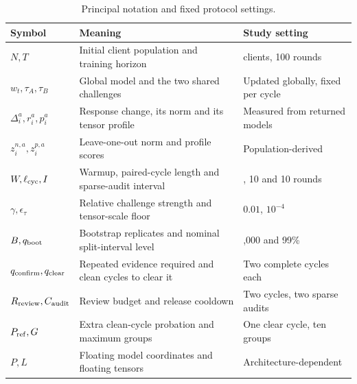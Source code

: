 \begin{table}[t]\centering\footnotesize
\renewcommand{\arraystretch}{1.12}
\caption{Principal notation and fixed protocol settings.}\label{tab:notation-settings}
\begin{tabular}{>{\raggedright\arraybackslash}p{3.1cm}>{\raggedright\arraybackslash}p{8.0cm}>{\raggedright\arraybackslash}p{4.8cm}}\toprule
Symbol & Meaning & Study setting \\ \midrule
$N,T$ & Initial client population and training horizon & 100 clients, 100 rounds \\
$w_t,\tau_A,\tau_B$ & Global model and the two shared challenges & Updated globally, fixed per cycle \\
$\Delta_i^a,r_i^a,p_i^a$ & Response change, its norm and its tensor profile & Measured from returned models \\
$z_i^{n,a},z_i^{p,a}$ & Leave-one-out norm and profile scores & Population-derived \\
$W,\ell_{\rm cyc},I$ & Warmup, paired-cycle length and sparse-audit interval & 10, 10 and 10 rounds \\
$\gamma,\epsilon_\tau$ & Relative challenge strength and tensor-scale floor & $0.01$, $10^{-4}$ \\
$B,q_{\rm boot}$ & Bootstrap replicates and nominal split-interval level & 1,000 and 99\% \\
$q_{\rm confirm},q_{\rm clear}$ & Repeated evidence required and clean cycles to clear it & Two complete cycles each \\
$R_{\rm review},C_{\rm audit}$ & Review budget and release cooldown & Two cycles, two sparse audits \\
$P_{\rm ref},G$ & Extra clean-cycle probation and maximum groups & One clear cycle, ten groups \\
$P,L$ & Floating model coordinates and floating tensors & Architecture-dependent \\
\bottomrule\end{tabular}
\end{table}
